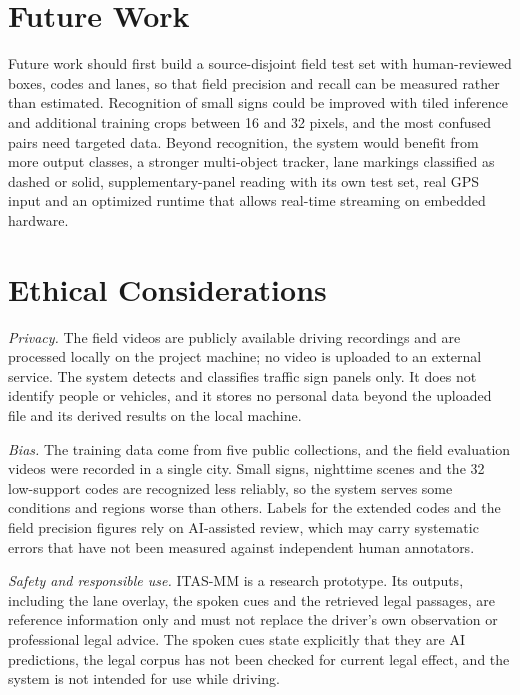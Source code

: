\documentclass[conference,a4paper]{IEEEtran}
\begin{document}
\section{Future Work}\label{sec:future}

Future work should first build a source-disjoint field test set with human-reviewed boxes, codes and lanes, so that field precision and recall can be measured rather than estimated. Recognition of small signs could be improved with tiled inference and additional training crops between 16 and 32 pixels, and the most confused pairs need targeted data. Beyond recognition, the system would benefit from more output classes, a stronger multi-object tracker, lane markings classified as dashed or solid, supplementary-panel reading with its own test set, real GPS input and an optimized runtime that allows real-time streaming on embedded hardware.

\section{Ethical Considerations}\label{sec:ethics}

\textit{Privacy.} The field videos are publicly available driving recordings and are processed locally on the project machine; no video is uploaded to an external service. The system detects and classifies traffic sign panels only. It does not identify people or vehicles, and it stores no personal data beyond the uploaded file and its derived results on the local machine.

\textit{Bias.} The training data come from five public collections, and the field evaluation videos were recorded in a single city. Small signs, nighttime scenes and the 32 low-support codes are recognized less reliably, so the system serves some conditions and regions worse than others. Labels for the extended codes and the field precision figures rely on AI-assisted review, which may carry systematic errors that have not been measured against independent human annotators.

\textit{Safety and responsible use.} ITAS-MM is a research prototype. Its outputs, including the lane overlay, the spoken cues and the retrieved legal passages, are reference information only and must not replace the driver's own observation or professional legal advice. The spoken cues state explicitly that they are AI predictions, the legal corpus has not been checked for current legal effect, and the system is not intended for use while driving.
\end{document}
